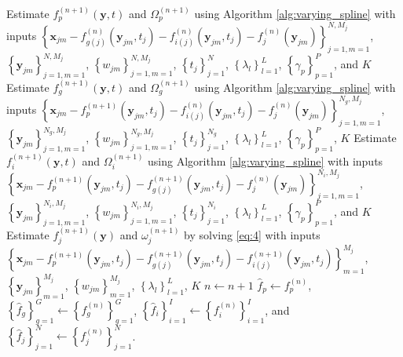 \documentclass[11pt,reqno]{article}
\theoremstyle{definition}
\begin{document}
\begin{algorithm}
{    Estimate $f_{p}^{(n+1)}(\mathbf{y}, t)$ and $\Omega_{p}^{(n+1)}$ using Algorithm \ref{alg:varying_spline} with inputs $\left\{\mathbf{x}_{jm} - f_{g(j)}^{(n)}(\mathbf{y}_{jm}, t_j) - f_{i(j)}^{(n)}(\mathbf{y}_{jm}, t_j) - f_j^{(n)}(\mathbf{y}_{jm})\right\}_{j=1, m=1}^{N, M_j}$, $\left\{\mathbf{y}_{jm}\right\}_{j=1, m=1}^{N, M_j}$, $\left\{w_{jm}\right\}_{j=1, m=1}^{N, M_j}$, $\left\{t_{j}\right\}_{j=1}^{N}$, $\left\{\lambda_l\right\}_{l=1}^{L}$, $\left\{\gamma_p\right\}_{p=1}^{P}$, and $K$\;
     {
      Estimate $f_{g}^{(n+1)}(\mathbf{y}, t)$ and $\Omega_{g}^{(n+1)}$ using Algorithm \ref{alg:varying_spline} with inputs $\left\{\mathbf{x}_{jm} - f_{p}^{(n+1)}(\mathbf{y}_{jm}, t_j) - f_{i(j)}^{(n)}(\mathbf{y}_{jm}, t_j) - f_{j}^{(n)}(\mathbf{y}_{jm})\right\}_{j=1, m=1}^{N_g, M_j}$, $\left\{\mathbf{y}_{jm}\right\}_{j=1, m=1}^{N_g, M_j}$, $\left\{w_{jm}\right\}_{j=1, m=1}^{N_g, M_j}$, $\left\{t_j\right\}_{j=1}^{N_g}$, $\left\{\lambda_l\right\}_{l=1}^{L}$, $\left\{\gamma_p\right\}_{p=1}^{P}$, $K$\;
    }
     {
      Estimate $f_{i}^{(n+1)}(\mathbf{y}, t)$ and $\Omega_{i}^{(n+1)}$ using Algorithm \ref{alg:varying_spline} with inputs $\left\{\mathbf{x}_{jm} - f_{p}^{(n+1)}(\mathbf{y}_{jm}, t_j) - f_{g(j)}^{(n+1)}(\mathbf{y}_{jm}, t_j) - f_j^{(n)}(\mathbf{y}_{jm})\right\}_{j=1, m=1}^{N_i, M_j}$, $\left\{\mathbf{y}_{jm}\right\}_{j=1, m=1}^{N_i, M_j}$, $\left\{w_{jm}\right\}_{j=1, m=1}^{N_i, M_j}$, $\left\{t_j\right\}_{j=1}^{N_i}$, $\left\{\lambda_l\right\}_{l=1}^{L}$, $\left\{\gamma_p\right\}_{p=1}^{P}$, and $K$\;
    }
     {
      Estimate $f_{j}^{(n+1)}(\mathbf{y})$ and $\omega_{j}^{(n+1)}$ by solving \ref{eq:4} with inputs $\left\{\mathbf{x}_{jm} - f_{p}^{(n+1)}(\mathbf{y}_{jm}, t_j) - f_{g(j)}^{(n+1)}(\mathbf{y}_{jm}, t_j) - f_{i(j)}^{(n+1)}(\mathbf{y}_{jm}, t_j)\right\}_{m=1}^{M_j}$, $\left\{\mathbf{y}_{jm}\right\}_{m=1}^{M_j}$, $\left\{w_{jm}\right\}_{m = 1}^{M_j}$, $\left\{\lambda_l\right\}_{l=1}^{L}$, $K$\;
    }
    $n \gets n + 1$\;
  }
  $\hat{f}_p \gets f_{p}^{(n)}$, $\left\{\hat{f}_g\right\}_{g = 1}^{G} \gets \left\{f_{g}^{(n)}\right\}_{g = 1}^{G}$, $\left\{\hat{f}_i\right\}_{i=1}^{I} \gets \left\{f_{i}^{(n)}\right\}_{i=1}^{I}$, and $\left\{\hat{f}_j\right\}_{j=1}^{N} \gets \left\{f_j^{(n)}\right\}_{j=1}^{N}$.
\end{algorithm}
\end{document}
